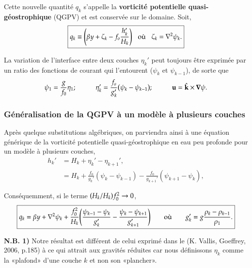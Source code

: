 \documentclass{article}
\numberwithin{equation}{section}
\newcommand{\kvf}{\hat{\vb{k}}}
\begin{document}
Cette nouvelle quantité \(q_k\) s'appelle la \textbf{vorticité potentielle quasi-géostrophique} (QGPV) et est conservée sur le domaine.
Soit,
\begin{equation}
\label{eq:orgd3c05a7}
\boxed{q_k \equiv \qty( \beta  y + \zeta_k - f_o \frac{h_k'}{H_k})
\hspace{0.3cm} \text{où} \hspace{0.3cm}
\zeta_k = \laplacian \psi_k.}
\end{equation}

La variation de l'interface entre deux couches \(\eta_k'\) peut toujours être exprimée par un ratio des fonctions de courant qui l'entourent (\(\psi_{k}\) et \(\psi_{k-1}\)), de sorte que 
\begin{equation}
\psi_1 = \frac{g}{f_0} \eta_1; 
\hspace{1cm} \eta_k' = \frac{f_o}{g_k'} \qty(\psi_k - \psi_{k-1});
\hspace{1cm} \vb{u} = \kvf \times \gradient\psi.
\end{equation}

\subsubsection{Généralisation de la QGPV à un modèle à plusieurs couches}
\label{sec:org8b673da}

Après quelque substitutions algébriques, on parviendra ainsi à une équation générique de la vorticité potentielle quasi-géostrophique en eau peu profonde pour un modèle à plusieurs couches,
\begin{align}
h_k' &= H_k + \eta_k' - \eta_{k+1}',\\
&= H_k + \frac{f_0}{g_k'} (\psi_k - \psi_{k-1}) - \frac{f_0}{g_{k+1}'} (\psi_{k+1} - \psi_k),
\end{align}

Conséquemment, si le terme \(\qty(H_k/H_k)f_0^2 \rightarrow 0\), 
\begin{equation}
\boxed{q_k  = \beta y + \laplacian \psi_k + \frac{f_0^2}{H_k} \qty(\frac{\psi_{k-1}-\psi_k}{g_k'} -  \frac{\psi_k - \psi_{k+1}}{g_{k+1}'})
\hspace{0.7cm} \text{où} \hspace{0.7cm}
g_k' = g \frac{\rho_k - \rho_{k-1}}{\rho_1}.}
\end{equation}

\textbf{N.B. 1)} Notre résultat est différent de celui exprimé dans le (K. Vallis, Goeffrey, 2006, p.185) à ce qui attrait aux gravités réduites car nous définissons \(\eta_k\) comme la «plafond» d'une couche \(k\) et non son «plancher».\\[0pt]
\end{document}
